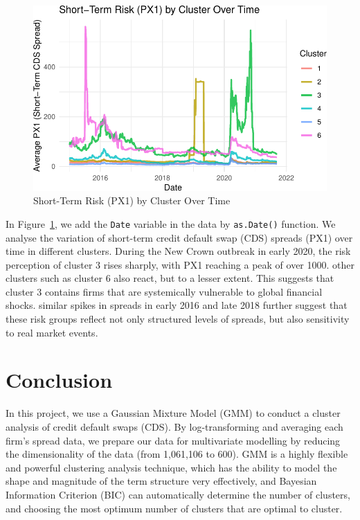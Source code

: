 \documentclass[
  letterpaper,
  DIV=11,
  numbers=noendperiod]{scrartcl}
\begin{document}
\begin{figure}

{\centering \includegraphics{437_final_project_files/figure-pdf/fig-year-plot-1.pdf}

}

\caption{\label{fig-year-plot}Short-Term Risk (PX1) by Cluster Over
Time}

\end{figure}

In Figure~\ref{fig-year-plot}, we add the \texttt{Date} variable in the
data by \texttt{as.Date()} function. We analyse the variation of
short-term credit default swap (CDS) spreads (PX1) over time in
different clusters. During the New Crown outbreak in early 2020, the
risk perception of cluster 3 rises sharply, with PX1 reaching a peak of
over 1000. other clusters such as cluster 6 also react, but to a lesser
extent. This suggests that cluster 3 contains firms that are
systemically vulnerable to global financial shocks. similar spikes in
spreads in early 2016 and late 2018 further suggest that these risk
groups reflect not only structured levels of spreads, but also
sensitivity to real market events.

\hypertarget{conclusion}{%
\section{Conclusion}\label{conclusion}}

In this project, we use a Gaussian Mixture Model (GMM) to conduct a
cluster analysis of credit default swaps (CDS). By log-transforming and
averaging each firm's spread data, we prepare our data for multivariate
modelling by reducing the dimensionality of the data (from 1,061,106 to
600). GMM is a highly flexible and powerful clustering analysis
technique, which has the ability to model the shape and magnitude of the
term structure very effectively, and Bayesian Information Criterion
(BIC) can automatically determine the number of clusters, and choosing
the most optimum number of clusters that are optimal to cluster.
\end{document}
